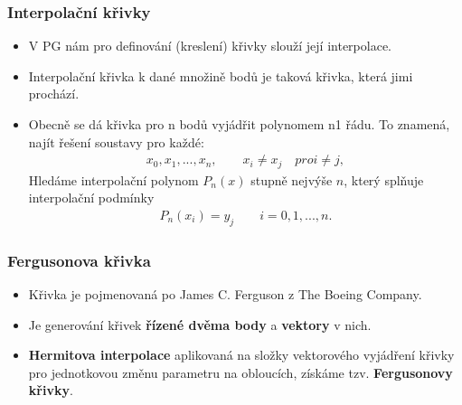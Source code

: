 \subsubsection{Interpolační křivky}
\begin{itemize}
	\item V PG nám pro definování (kreslení) křivky slouží její interpolace.
	\item Interpolační křivka k dané množině bodů je taková křivka, která jimi prochází.
	\item Obecně se dá křivka pro n bodů vyjádřit polynomem n1 řádu. To znamená, najít řešení soustavy pro každé:
	\begin{equation*}  
			\begin{array}{c}
			  x_{0},x_{1},...,x_{n},  \quad \quad x_{i} \neq x_{j} \quad pro  i \neq j,
			  \end{array}
			\end{equation*}
			Hledáme interpolační polynom $P_{n}(x)$ stupně nejvýše $n$, který splňuje interpolační podmínky
			\begin{equation*}  
			\begin{array}{c}
			  P_{n}(x_{i}) = y_{j} \quad \quad i = 0,1,...,n.
			  \end{array}
			\end{equation*}
	\end{itemize}

\subsubsection{Fergusonova křivka}
\begin{itemize}
	\item Křivka je pojmenovaná po James C. Ferguson z The Boeing Company.
	\item Je generování křivek \textbf{řízené dvěma body} a \textbf{vektory} v nich.
	\item \textbf{Hermitova interpolace} aplikovaná na složky vektorového vyjádření křivky pro jednotkovou změnu parametru na obloucích, získáme tzv. \textbf{Fergusonovy křivky}.
\end{itemize}


